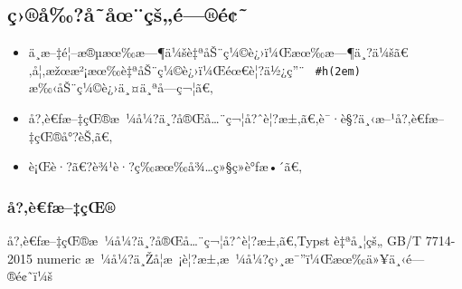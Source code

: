 \subsection{ç›®å‰?å­˜åœ¨çš„é---®é¢˜}\label{uxe7uxe5uxe5uxe5ux153uxe7ux161uxe9uxe9}

\begin{itemize}
\tightlist
\item
  ä¸­æ--‡é¦--æ®µæœ‰æ---¶ä¼šè‡ªåŠ¨ç¼©è¿›ï¼Œæœ‰æ---¶ä¸?ä¼šã€‚å¦‚æžœæ²¡æœ‰è‡ªåŠ¨ç¼©è¿›ï¼Œéœ€è¦?ä½¿ç''¨
  \texttt{\ \#h(2em)\ } æ‰‹åŠ¨ç¼©è¿›ä¸¤ä¸ªå­---ç¬¦ã€‚
\item
  å?‚è€ƒæ--‡çŒ®æ~¼å¼?ä¸?å®Œå\ldots¨ç¬¦å?ˆè¦?æ±‚ã€‚è¯·è§?ä¸‹æ--¹å?‚è€ƒæ--‡çŒ®å°?èŠ‚ã€‚
\item
  è¡Œè·?ã€?è¾¹è·?ç­‰æœ‰å¾\ldots ç»§ç»­è°ƒæ•´ã€‚
\end{itemize}

\subsubsection{å?‚è€ƒæ--‡çŒ®}\label{uxe5uxe8ux192uxe6uxe7ux153}

å?‚è€ƒæ--‡çŒ®æ~¼å¼?ä¸?å®Œå\ldots¨ç¬¦å?ˆè¦?æ±‚ã€‚Typst è‡ªå¸¦çš„ GB/T
7714-2015 numeric
æ~¼å¼?ä¸Žå­¦æ~¡è¦?æ±‚æ~¼å¼?ç›¸æ¯''ï¼Œæœ‰ä»¥ä¸‹é---®é¢˜ï¼š

